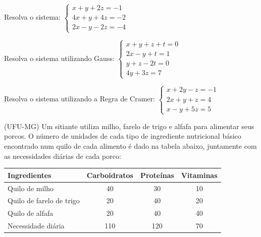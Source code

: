 \documentclass[pdftex, brazil, 12pt, oneside, addpoints]{exam}
\begin{document}
\begin{questions}

\question
Resolva o sistema:
$\begin{cases}
  x + y + 2z = -1\\
  4x + y + 4z = -2\\
  2x - y - 2z = -4
\end{cases}$

\question
Resolva o sistema utilizando Gauss:
$\begin{cases}
  x + y + z + t = 0\\
  2x - y + t = 1\\
  y + z - 2t = 0\\
  4y + 3z = 7
\end{cases}$

\question
Resolva o sistema utilizando a Regra de Cramer:
$\begin{cases}
  x + 2y - z = -1\\
  2x + y + z = 4\\
  x - y + 5z = 5
\end{cases}$

\question
(UFU-MG) Um sitiante utiliza milho, farelo de trigo e alfafa para
alimentar seus porcos. O número de unidades de cada tipo de ingrediente
nutricional básico encontrado num quilo de cada alimento é dado na
tabela abaixo, juntamente com as necessidades diárias de cada porco:

\begin{table}[h]
\centering
\begin{tabular}{@{}lccc@{}}
\toprule
\textbf{Ingredientes}    & \multicolumn{1}{l}{\textbf{Carboidratos}} & \multicolumn{1}{l}{\textbf{Proteínas}} & \multicolumn{1}{l}{\textbf{Vitaminas}} \\ \midrule
Quilo de milho           & 40                                        & 30                                     & 10                                     \\
Quilo de farelo de trigo & 20                                        & 40                                     & 20                                     \\
Quilo de alfafa          & 20                                        & 40                                     & 40                                     \\
Necessidade diária       & 110                                       & 120                                    & 70                                     \\ \bottomrule
\end{tabular}
\end{table}


\end{questions}
\end{document}
